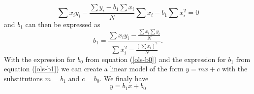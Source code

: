 \documentclass[12pt,a4paper]{report}
\begin{document}
		\begin{equation}
			\sum x_{i}y_{i}-\frac{\sum y_{i} -b_{1}\sum x_{i}}{N}\sum x_{i}-b_{1}\sum x_{i}^{2}=0
		\end{equation}
		and $b_{1}$ can then be expressed as
		\begin{equation}
			b_{1}=\frac{\sum x_{i}y_{i}-\frac{\sum x_{i} \sum y_{i}}{N}}{\sum x_{i}^{2}-\frac{\left(\sum x_{i}\right)^{2}}{N}}.
			\label{ols-b1}
		\end{equation}
		With the expression for $b_{0}$ from equation (\ref{ols-b0}) and the expression for $b_{1}$ from equation (\ref{ols-b1}) we can create a linear model of the form $y=mx+c$ with the substitutions $m = b_{1}$ and $c = b_{0}$. We finaly have 
		\begin{equation}
			y = b_{1}x + b_{0}
		\end{equation}

\end{document}
